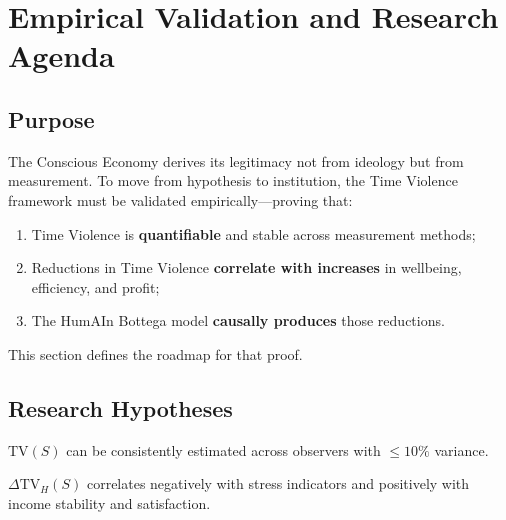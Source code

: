 
\section{Empirical Validation and Research Agenda}
\label{sec:empirical}

\subsection{Purpose}
\label{sec:empirical-purpose}

The Conscious Economy derives its legitimacy not from ideology but from measurement. To move from hypothesis to institution, the Time Violence framework must be validated empirically—proving that:

\begin{enumerate}
    \item Time Violence is \textbf{quantifiable} and stable across measurement methods;
    \item Reductions in Time Violence \textbf{correlate with increases} in wellbeing, efficiency, and profit;
    \item The HumAIn Bottega model \textbf{causally produces} those reductions.
\end{enumerate}

This section defines the roadmap for that proof.

\subsection{Research Hypotheses}
\label{sec:hypotheses}

\begin{hypothesis}[Quantifiability]
\label{hyp:quantifiability}
$\text{TV}(S)$ can be consistently estimated across observers with $\leq 10\%$ variance.
\end{hypothesis}

\begin{hypothesis}[Correlation]
\label{hyp:correlation}
$\Delta \text{TV}_H(S)$ correlates negatively with stress indicators and positively with income stability and satisfaction.
\end{hypothesis}

